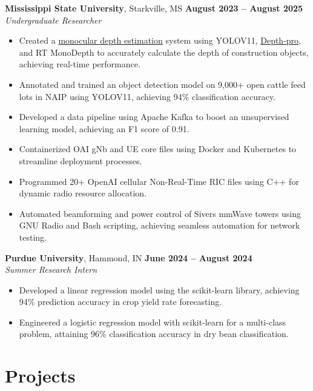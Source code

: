\documentclass[letterpaper,10pt]{article} %
\begin{document}
\textbf{Mississippi State University}, Starkville, MS \hfill \textbf{August 2023 -- August 2025} \\
\textit{Undergraduate Researcher}
\begin{itemize}
    \item Created a \href{https://github.com/Ashwani564/RT-Monodepth-Construction}{monocular depth estimation} system using YOLOV11, \href{https://github.com/Ashwani564/ml-depth-pro-flask}{Depth-pro}, and RT MonoDepth to accurately calculate the depth of construction objects, achieving real-time performance. %
    \item Annotated and trained an object detection model on 9,000+ open cattle feed lots in NAIP using YOLOV11, achieving 94\% classification accuracy. %
    \item Developed a data pipeline using Apache Kafka to boost an unsupervised learning model, achieving an F1 score of 0.91. %
    \item Containerized OAI gNb and UE core files using Docker and Kubernetes to streamline deployment processes. %
    \item Programmed 20+ OpenAI cellular Non-Real-Time RIC files using C++ for dynamic radio resource allocation. %
    \item Automated beamforming and power control of Sivers mmWave towers using GNU Radio and Bash scripting, achieving seamless automation for network testing. %
\end{itemize}

\textbf{Purdue University}, Hammond, IN \hfill \textbf{June 2024 -- August 2024} \\
\textit{Summer Research Intern}
\begin{itemize}
    \item Developed a linear regression model using the scikit-learn library, achieving 94\% prediction accuracy in crop yield rate forecasting. %
    \item Engineered a logistic regression model with scikit-learn for a multi-class problem, attaining 96\% classification accuracy in dry bean classification. %
\end{itemize}


\section*{Projects}
\end{document}
